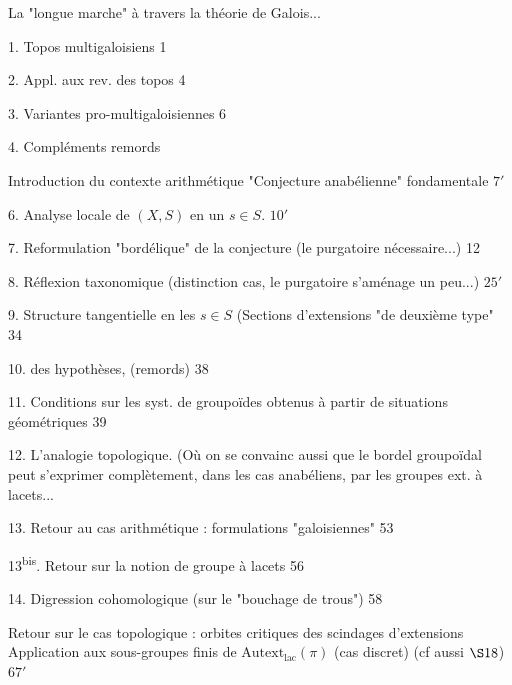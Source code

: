 


La "longue marche" à travers la théorie de Galois...

1. Topos multigaloisiens \hfill 1

2. Appl. aux rev. des topos \hfill 4

3. Variantes pro-multigaloisiennes \hfill 6

4. Compléments remords


 Introduction du contexte arithmétique
"Conjecture anabélienne" fondamentale \hfill \(7'\)

6. Analyse locale de \((X,S)\) en un \(s\in S\). \hfill \(10'\)

7. Reformulation "bordélique" de la conjecture
(le purgatoire nécessaire...) \hfill 12

8. Réflexion taxonomique (distinction 
cas,  le purgatoire s'aménage un peu...) \hfill \(25'\)

9. Structure tangentielle en les \(s\in S\)
(Sections d'extensions "de deuxième type" \hfill 34

10.  des hypothèses, (remords) \hfill 38

11. Conditions sur les syst. de groupoïdes obtenus à partir de
situations géométriques \hfill 39

12. L'analogie topologique. (Où on se convainc aussi que le bordel
groupoïdal peut s'exprimer complètement, dans les cas anabéliens,
par les groupes ext. à lacets... \hfill {}

13. Retour au cas arithmétique : formulations "galoisiennes" \hfill 53

13\textsuperscript{bis}. Retour sur la notion de groupe à lacets \hfill 56

14. Digression cohomologique (sur le "bouchage de trous") \hfill 58

 Retour sur le cas topologique : orbites critiques
 des scindages d'extensions
Application aux sous-groupes finis de
\(\mathrm{Autext}_{\mathrm{lac}}(\pi)\) (cas discret)
(cf aussi \(\S 18\)) \hfill \(67'\)

